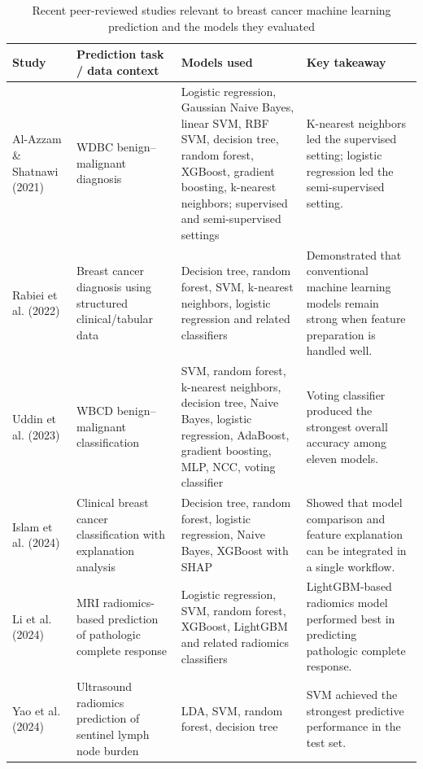 \documentclass[conference]{IEEEtran}
\begin{document}
\begin{table}[htbp]
\caption{Recent peer-reviewed studies relevant to breast cancer machine learning prediction and the models they evaluated}
\label{tab:lit_summary}
\centering
\footnotesize
\begin{tabularx}{\textwidth}{>{\raggedright\arraybackslash}p{2.7cm} >{\raggedright\arraybackslash}p{2.8cm} >{\raggedright\arraybackslash}X >{\raggedright\arraybackslash}X}
\toprule
\textbf{Study} & \textbf{Prediction task / data context} & \textbf{Models used} & \textbf{Key takeaway} \\
\midrule
Al-Azzam \& Shatnawi (2021) \cite{b3} & WDBC benign--malignant diagnosis & Logistic regression, Gaussian Naive Bayes, linear SVM, RBF SVM, decision tree, random forest, XGBoost, gradient boosting, k-nearest neighbors; supervised and semi-supervised settings & K-nearest neighbors led the supervised setting; logistic regression led the semi-supervised setting. \\
Rabiei et al. (2022) \cite{b12} & Breast cancer diagnosis using structured clinical/tabular data & Decision tree, random forest, SVM, k-nearest neighbors, logistic regression and related classifiers & Demonstrated that conventional machine learning models remain strong when feature preparation is handled well. \\
Uddin et al. (2023) \cite{b13} & WBCD benign--malignant classification & SVM, random forest, k-nearest neighbors, decision tree, Naive Bayes, logistic regression, AdaBoost, gradient boosting, MLP, NCC, voting classifier & Voting classifier produced the strongest overall accuracy among eleven models. \\
Islam et al. (2024) \cite{b14} & Clinical breast cancer classification with explanation analysis & Decision tree, random forest, logistic regression, Naive Bayes, XGBoost with SHAP & Showed that model comparison and feature explanation can be integrated in a single workflow. \\
Li et al. (2024) \cite{b15} & MRI radiomics-based prediction of pathologic complete response & Logistic regression, SVM, random forest, XGBoost, LightGBM and related radiomics classifiers & LightGBM-based radiomics model performed best in predicting pathologic complete response. \\
Yao et al. (2024) \cite{b16} & Ultrasound radiomics prediction of sentinel lymph node burden & LDA, SVM, random forest, decision tree & SVM achieved the strongest predictive performance in the test set. \\

\end{tabularx}
\end{table}
\end{document}
